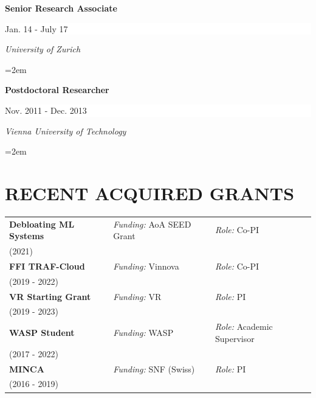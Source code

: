 \documentclass[paper=letter,fontsize=11pt]{scrartcl} %
\newcommand{\NewPart}[2]{\section*{\uppercase{#1} #2}}
\newcommand{\EducationEntry}[4]{
		\noindent \textbf{#1} \hfill      %
		\colorbox{White}{%
			\parbox{10em}{%
			\hfill\color{Black}#2}} \par  %
		\noindent \textit{#3} \par        %
		\noindent\hangindent=2em\hangafter=0 \small #4 %
		\normalsize \par}
\begin{document}
\EducationEntry{Senior Research Associate}{Jan. 14 - July 17}{University of
Zurich}{
}
\EducationEntry{Postdoctoral Researcher}{Nov. 2011 - Dec. 2013}{Vienna
University of Technology}{}

\NewPart{Recent Acquired Grants}{}

\renewcommand{\arraystretch}{0.75}
  \begin{tabular}{p{4.8cm}ll}
          \textbf{Debloating ML Systems} & \emph{Funding:} AoA SEED Grant & \emph{Role:} Co-PI \\
    (2021) & & \\
        \textbf{FFI TRAF-Cloud} & \emph{Funding:} Vinnova & \emph{Role:} Co-PI \\
    (2019 - 2022) & & \\
      \textbf{VR Starting Grant} & \emph{Funding:} VR & \emph{Role:} PI \\
    (2019 - 2023) & & \\
      \textbf{WASP Student} & \emph{Funding:} WASP & \emph{Role:} Academic Supervisor \\
    (2017 - 2022) & & \\
      \textbf{MINCA} & \emph{Funding:} SNF (Swiss) & \emph{Role:} PI \\
    (2016 - 2019) & & \\
  \end{tabular}

%
%
\end{document}
